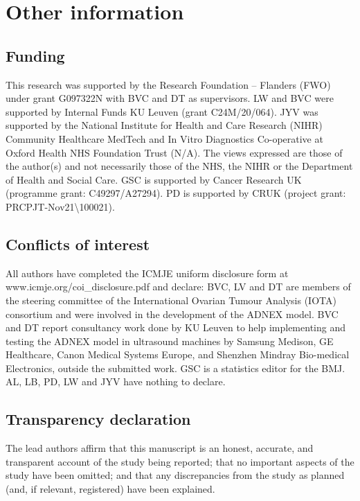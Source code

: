 \section*{Other information}
\subsection*{Funding}
This research was supported by the Research Foundation – Flanders (FWO) under
grant G097322N with BVC and DT as supervisors. LW and BVC were supported by
Internal Funds KU Leuven (grant C24M/20/064). JYV was supported by the National
Institute for Health and Care Research (NIHR) Community Healthcare MedTech and
In Vitro Diagnostics Co-operative at Oxford Health NHS Foundation Trust (N/A).
The views expressed are those of the author(s) and not necessarily those of the
NHS, the NIHR or the Department of Health and Social Care. GSC is supported by
Cancer Research UK (programme grant: C49297/A27294). PD is supported by CRUK
(project grant: PRCPJT-Nov21\textbackslash100021).

\subsection*{Conflicts of interest}
All authors have completed the ICMJE uniform disclosure form at
www.icmje.org/coi\_disclosure.pdf and declare: BVC, LV and DT are members of the
steering committee of the International Ovarian Tumour Analysis (\gls{IOTA})
consortium and were involved in the development of the \gls{ADNEX} model. BVC and DT
report consultancy work done by KU Leuven to help implementing and testing the
\gls{ADNEX} model in ultrasound machines by Samsung Medison, GE Healthcare, Canon
Medical Systems Europe, and Shenzhen Mindray Bio-medical Electronics, outside
the submitted work. GSC is a statistics editor for the BMJ. AL, LB, PD, LW and
JYV have nothing to declare.

\subsection*{Transparency declaration}
The lead authors affirm that this manuscript is an honest, accurate, and
transparent account of the study being reported; that no important aspects of
the study have been omitted; and that any discrepancies from the study as
planned (and, if relevant, registered) have been explained.

